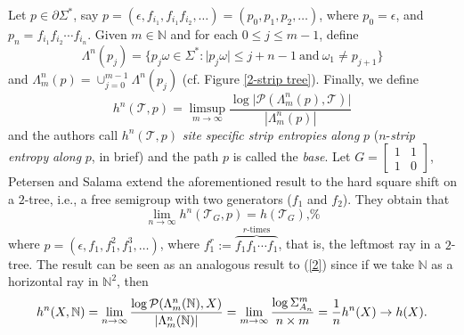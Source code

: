 \documentclass{amsart}
\theoremstyle{definition}
\begin{document}
Let $p\in \partial \Sigma^{\ast }$, say $p=(\epsilon
,f_{i_{1}},f_{i_{1}}f_{i_{2}},\ldots)=(p_{0},p_{1},p_{2},\ldots )$, where $p_{0}=\epsilon$, and $p_{n}=f_{i_{1}}f_{i_{2}}\cdots f_{i_{n}}$. Given $m\in \mathbb{N}$ and for each $0\leq j\leq m-1$, define \[\Lambda^{n}(p_{j})=\{p_{j}\omega\in\Sigma^{\ast}:\lvert p_{j}\omega\rvert\leq j+n-1~\text{and}~\omega_{1}\neq p_{j+1}\}\] and $\Lambda_m^n(p)=\cup_{j=0}^{m-1}\Lambda^{n}(p_{j})$ (cf. Figure \ref{2-strip tree}). Finally, we define
\begin{equation}
h^{n}(\mathcal{T},p)=\limsup_{m\rightarrow
\infty }\frac{\log \lvert\mathcal{P}(\Lambda _{m}^{n}(p),\mathcal{T})\rvert}{\left\vert
\Lambda _{m}^{n}(p)\right\vert }
\end{equation}
and the authors \cite{petersen2020entropy} call $h^{n}(\mathcal{T},p)$ \emph{site specific strip entropies} \emph{along }$p$ ($n$-\emph{strip entropy} \emph{along }$p$, in brief) and the path $p$ is called the \emph{base}. Let $G=\left[ 
\begin{array}{cc}
1 & 1 \\ 
1 & 0%
\end{array}\right] $, Petersen and Salama \cite{petersen2020entropy} extend the aforementioned result to the hard square shift on a $2$-tree, i.e., a free
semigroup with two generators ($f_1$ and $f_2$). They obtain that 
\begin{equation}
\lim_{n\rightarrow \infty }h^{n}(\mathcal{T}_{G},p)=h(\mathcal{T}_{G})\text{,%
}  \label{3}
\end{equation}%
where $p=(\epsilon ,f_{1},f_{1}^{2},f_{1}^{3},\ldots )$, where $f_{1}^{r}:=%
\overbrace{f_{1}f_{1}\cdots f_{1}}^{r\text{-times}}$, that is, the leftmost
ray in a $2$-tree. The result can be seen as an analogous result to (\ref{2}) since if we take $\mathbb{N}$ as a horizontal ray in $\mathbb{N}^{2}$,
then 
\[
h^{n}(X,\mathbb{N})=\lim_{n\rightarrow \infty }\frac{\log \mathcal{P}%
(\Lambda _{m}^{n}(\mathbb{N}),X)}{\left\vert \Lambda _{m}^{n}(\mathbb{N}%
)\right\vert }=\lim_{m\rightarrow \infty }\frac{\log \Sigma _{A_{n}}^{m}}{%
n\times m}=\frac{1}{n}h^{n}(X)\rightarrow h(X)\text{.}
\]
\end{document}
